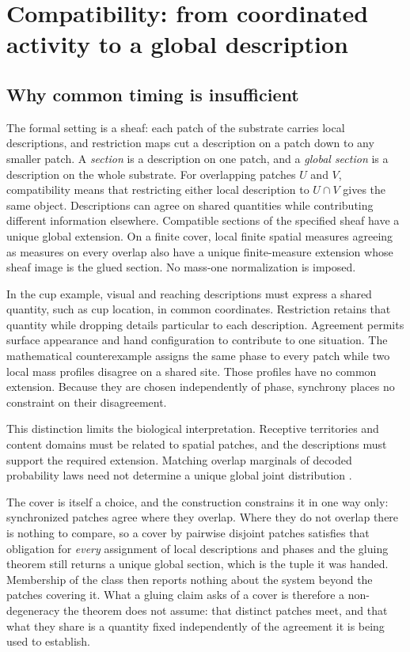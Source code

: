 \documentclass[12pt]{article}
\renewcommand{\cite}[1]{\citep{#1}}
\begin{document}
\section{Compatibility: from coordinated activity to a global description}
\label{sec:unity}

\subsection{Why common timing is insufficient}

The formal setting is a sheaf: each patch of the substrate carries local descriptions, and restriction maps cut a description on a patch down to any smaller patch. A \emph{section} is a description on one patch, and a \emph{global section} is a description on the whole substrate. For overlapping patches $U$ and $V$, compatibility means that restricting either local description to $U\cap V$ gives the same object. Descriptions can agree on shared quantities while contributing different information elsewhere. Compatible sections of the specified sheaf have a unique global extension. On a finite cover, local finite spatial measures agreeing as measures on every overlap also have a unique finite-measure extension whose sheaf image is the glued section. No mass-one normalization is imposed.

In the cup example, visual and reaching descriptions must express a shared quantity, such as cup location, in common coordinates. Restriction retains that quantity while dropping details particular to each description. Agreement permits surface appearance and hand configuration to contribute to one situation. The mathematical counterexample assigns the same phase to every patch while two local mass profiles disagree on a shared site. Those profiles have no common extension. Because they are chosen independently of phase, synchrony places no constraint on their disagreement.

This distinction limits the biological interpretation. Receptive territories and content domains must be related to spatial patches, and the descriptions must support the required extension. Matching overlap marginals of decoded probability laws need not determine a unique global joint distribution \cite{abramsky2011}.

The cover is itself a choice, and the construction constrains it in one way only: synchronized patches agree where they overlap. Where they do not overlap there is nothing to compare, so a cover by pairwise disjoint patches satisfies that obligation for \emph{every} assignment of local descriptions and phases and the gluing theorem still returns a unique global section, which is the tuple it was handed. Membership of the class then reports nothing about the system beyond the patches covering it. What a gluing claim asks of a cover is therefore a non-degeneracy the theorem does not assume: that distinct patches meet, and that what they share is a quantity fixed independently of the agreement it is being used to establish.
\end{document}
